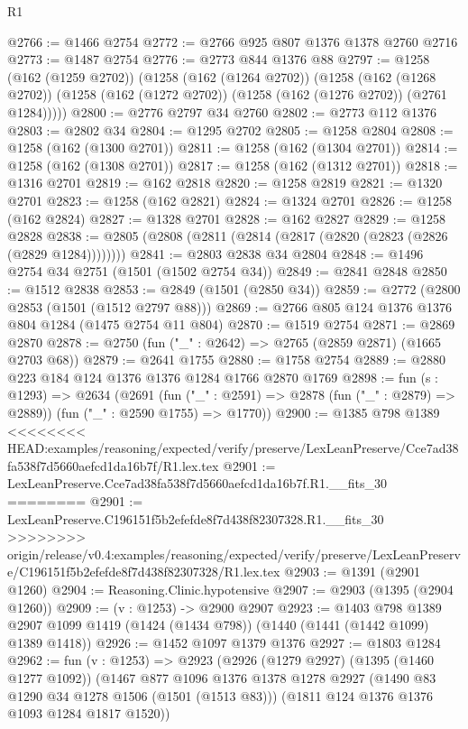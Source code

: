 \begin{lexlean}{R1}
\begin{coremodule}
{{{{{{{{{{{{{{{{{{{{{{{{{{{{{{{{{{{{{{{{{{{{{{{{{{{{{{{{{{{{{{{{{{{{{{{{{{{{{{{{{{{{{{{{{{@2766 := @1466 @2754
@2772 := @2766 @925 @807 @1376 @1378 @2760 @2716
@2773 := @1487 @2754
@2776 := @2773 @844 @1376 @88
@2797 := @1258
    (@162 (@1259 @2702))
    (@1258
      (@162 (@1264 @2702))
      (@1258
        (@162 (@1268 @2702))
        (@1258 (@162 (@1272 @2702)) (@1258 (@162 (@1276 @2702)) (@2761 @1284)))))
@2800 := @2776 @2797 @34 @2760
@2802 := @2773 @112 @1376
@2803 := @2802 @34
@2804 := @1295 @2702
@2805 := @1258 @2804
@2808 := @1258 (@162 (@1300 @2701))
@2811 := @1258 (@162 (@1304 @2701))
@2814 := @1258 (@162 (@1308 @2701))
@2817 := @1258 (@162 (@1312 @2701))
@2818 := @1316 @2701
@2819 := @162 @2818
@2820 := @1258 @2819
@2821 := @1320 @2701
@2823 := @1258 (@162 @2821)
@2824 := @1324 @2701
@2826 := @1258 (@162 @2824)
@2827 := @1328 @2701
@2828 := @162 @2827
@2829 := @1258 @2828
@2838 := @2805 (@2808 (@2811 (@2814 (@2817 (@2820 (@2823 (@2826 (@2829 @1284))))))))
@2841 := @2803 @2838 @34 @2804
@2848 := @1496 @2754 @34 @2751 (@1501 (@1502 @2754 @34))
@2849 := @2841 @2848
@2850 := @1512 @2838
@2853 := @2849 (@1501 (@2850 @34))
@2859 := @2772 (@2800 @2853 (@1501 (@1512 @2797 @88)))
@2869 := @2766 @805 @124 @1376 @1376 @804 @1284 (@1475 @2754 @11 @804)
@2870 := @1519 @2754
@2871 := @2869 @2870
@2878 := @2750 (fun ("_" : @2642) => @2765 (@2859 @2871) (@1665 @2703 @68))
@2879 := @2641 @1755
@2880 := @1758 @2754
@2889 := @2880 @223 @184 @124 @1376 @1376 @1284 @1766 @2870 @1769
@2898 := fun (s : @1293) =>
  @2634
    (@2691
      (fun ("_" : @2591) => @2878 (fun ("_" : @2879) => @2889))
      (fun ("_" : @2590 @1755) => @1770))
@2900 := @1385 @798 @1389
<<<<<<<< HEAD:examples/reasoning/expected/verify/preserve/LexLeanPreserve/Cce7ad38fa538f7d5660aefcd1da16b7f/R1.lex.tex
@2901 := LexLeanPreserve.Cce7ad38fa538f7d5660aefcd1da16b7f.R1.__fits_30
========
@2901 := LexLeanPreserve.C196151f5b2efefde8f7d438f82307328.R1.__fits_30
>>>>>>>> origin/release/v0.4:examples/reasoning/expected/verify/preserve/LexLeanPreserve/C196151f5b2efefde8f7d438f82307328/R1.lex.tex
@2903 := @1391 (@2901 @1260)
@2904 := Reasoning.Clinic.hypotensive
@2907 := @2903 (@1395 (@2904 @1260))
@2909 := (v : @1253) -> @2900 @2907
@2923 := @1403
    @798
    @1389
    @2907
    @1099
    @1419
    (@1424 (@1434 @798))
    (@1440 (@1441 (@1442 @1099) @1389 @1418))
@2926 := @1452 @1097 @1379 @1376
@2927 := @1803 @1284
@2962 := fun (v : @1253) =>
  @2923
    (@2926
      (@1279 @2927)
      (@1395 (@1460 @1277 @1092))
      (@1467
        @877
        @1096
        @1376
        @1378
        @1278
        @2927
        (@1490 @83 @1290 @34 @1278 @1506 (@1501 (@1513 @83)))
        (@1811 @124 @1376 @1376 @1093 @1284 @1817 @1520))
}}}}}}}}}}}}}}}}}}}}}}}}}}}}}}}}}}}}}}}}}}}}}}}}}}}}}}}}}}}}}}}}}}}}}}}}}}}}}}}}}}}}}}}}}}
\end{coremodule}
\end{lexlean}
